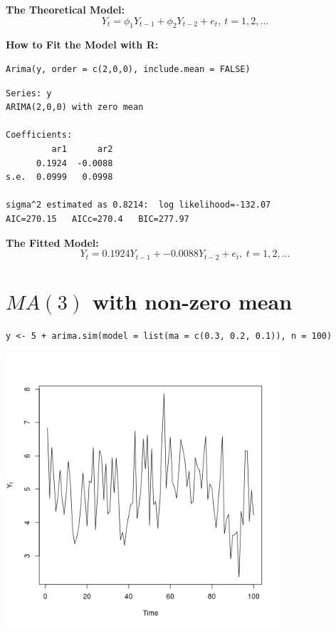 \documentclass[12pt]{article}
\begin{document}
\noindent
\textbf{The Theoretical Model:} 
\[
Y_{t} = \phi_{1}Y_{t - 1} + \phi_{2}Y_{t - 2}  + e_{t},\ t = 1,2,\ldots
\]

\noindent
\textbf{How to Fit the Model with R:}


\begin{verbatim}
Arima(y, order = c(2,0,0), include.mean = FALSE)
\end{verbatim}




\begin{verbatim}
Series: y 
ARIMA(2,0,0) with zero mean     

Coefficients:
         ar1      ar2
      0.1924  -0.0088
s.e.  0.0999   0.0998

sigma^2 estimated as 0.8214:  log likelihood=-132.07
AIC=270.15   AICc=270.4   BIC=277.97
\end{verbatim}

\noindent
\textbf{The Fitted Model:} 
\[
Y_{t} = 0.1924 Y_{t - 1} + -0.0088 Y_{t - 2}  +  e_{t},\ t = 1,2,\ldots
\]
\section*{$MA(3)$ with non-zero mean}
\label{sec-3}


\begin{verbatim}
y <- 5 + arima.sim(model = list(ma = c(0.3, 0.2, 0.1)), n = 100)
\end{verbatim}





\includegraphics[width=4.0in]{img/ma3nzm.png}
\end{document}
